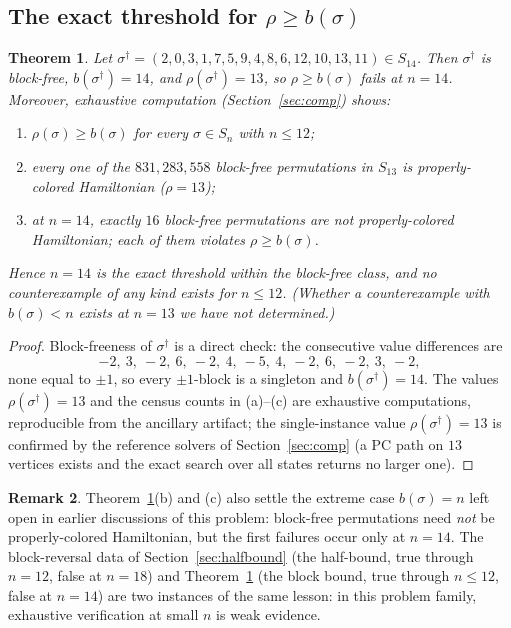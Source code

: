 \documentclass[11pt]{article}
\newtheorem{theorem}{Theorem}[section]
\theoremstyle{definition}
\newtheorem{remark}[theorem]{Remark}
\begin{document}
\subsection{The exact threshold for \texorpdfstring{$\rho \ge b(\sigma)$}{rho >= b}}

\begin{theorem}\label{thm:n14}
Let $\sigma^\dagger = (2,0,3,1,7,5,9,4,8,6,12,10,13,11) \in S_{14}$. Then
$\sigma^\dagger$ is block-free, $b(\sigma^\dagger) = 14$, and
$\rho(\sigma^\dagger) = 13$, so $\rho \ge b(\sigma)$ fails at $n = 14$. Moreover,
exhaustive computation (Section~\ref{sec:comp}) shows:
\begin{enumerate}
\item[(a)] $\rho(\sigma) \ge b(\sigma)$ for every $\sigma \in S_n$ with $n \le 12$;
\item[(b)] every one of the $831{,}283{,}558$ block-free permutations in $S_{13}$ is
properly-colored Hamiltonian ($\rho = 13$);
\item[(c)] at $n = 14$, exactly $16$ block-free permutations are not properly-colored
Hamiltonian; each of them violates $\rho \ge b(\sigma)$.
\end{enumerate}
Hence $n = 14$ is the exact threshold within the block-free class, and no
counterexample of any kind exists for $n \le 12$. (Whether a counterexample with
$b(\sigma) < n$ exists at $n = 13$ we have not determined.)
\end{theorem}

\begin{proof}
Block-freeness of $\sigma^\dagger$ is a direct check: the consecutive value
differences are
\[
-2,\ 3,\ -2,\ 6,\ -2,\ 4,\ -5,\ 4,\ -2,\ 6,\ -2,\ 3,\ -2,
\]
none equal to $\pm1$, so every $\pm1$-block is a singleton and
$b(\sigma^\dagger) = 14$. The values
$\rho(\sigma^\dagger) = 13$ and the census counts in (a)--(c) are exhaustive
computations, reproducible from the ancillary artifact; the single-instance value
$\rho(\sigma^\dagger) = 13$ is confirmed by the reference solvers of
Section~\ref{sec:comp} (a PC path on $13$ vertices exists and the exact search over
all states returns no larger one).
\end{proof}

\begin{remark}
Theorem~\ref{thm:n14}(b) and (c) also settle the extreme case
$b(\sigma) = n$ left open in earlier discussions of this problem: block-free
permutations need \emph{not} be properly-colored Hamiltonian, but the first failures
occur only at $n = 14$. The block-reversal data of Section~\ref{sec:halfbound}
(the half-bound, true through $n = 12$, false at $n = 18$) and
Theorem~\ref{thm:n14} (the block bound, true through $n \le 12$, false at $n = 14$)
are two instances of the same lesson: in this problem family, exhaustive verification
at small $n$ is weak evidence.
\end{remark}
\end{document}
